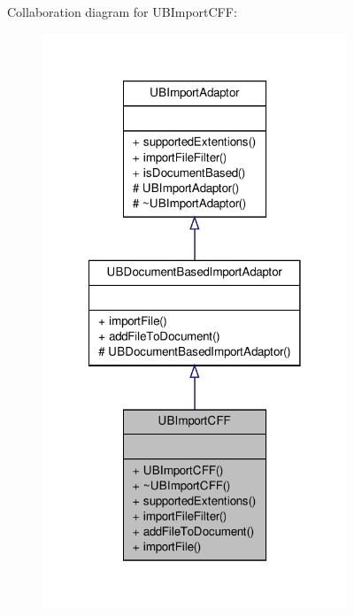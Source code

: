 Collaboration diagram for U\-B\-Import\-C\-F\-F\-:
\nopagebreak
\begin{figure}[H]
\begin{center}
\leavevmode
\includegraphics[width=258pt]{df/d43/class_u_b_import_c_f_f__coll__graph}
\end{center}
\end{figure}
